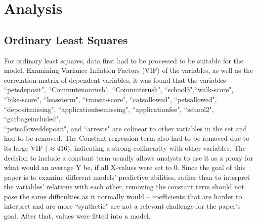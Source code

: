 \documentclass[12pt]{report}
\begin{document}
\section{Analysis}
\subsection{Ordinary Least Squares}
For ordinary least squares, data first had to be processed to be suitable for the model. Examining Variance Inflation Factors (VIF) of the variables, as well as the correlation matrix of dependent variables, it was found that the variables ``pets\textunderscore deposit", ``Commute\textunderscore nonrush", ``Commute\textunderscore rush", ``school3",``walk-score", ``bike-score", ``lease\textunderscore term", ``transit-score", ``cats\textunderscore allowed", ``pets\textunderscore allowed", ``deposit\textunderscore missing", ``application\textunderscore fee\textunderscore missing", ``application\textunderscore fee", ``school2", ``garbageincluded", \\ ``pets\textunderscore allowed\textunderscore deposit", and ``arrests" are colinear to other variables in the set and had to be removed. The Constant regression term also had to be removed due to its large VIF ($\approx416$), indicating a strong collinearity with other variables. The decision to include a constant term usually allows analysts to use it as a proxy for what would an average Y be, if all X-values were set to 0. Since the goal of this paper is to examine different models' predictive abilities, rather than to interpret the variables' relations with each other, removing the constant term should not pose the same difficulties as it normally would -- coefficients that are harder to interpret and are more ``synthetic" are not a relevant challenge for the paper's goal. After that, values were fitted into a model.
\end{document}
